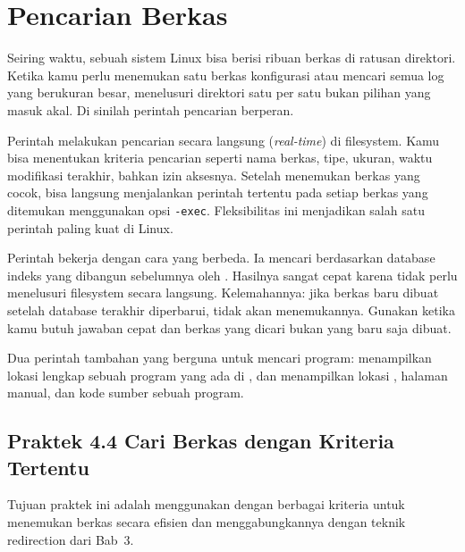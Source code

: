 \section{Pencarian Berkas}
\label{sec:search}

Seiring waktu, sebuah sistem Linux bisa berisi ribuan berkas di ratusan direktori. Ketika
kamu perlu menemukan satu berkas konfigurasi atau mencari semua log yang berukuran besar,
menelusuri direktori satu per satu bukan pilihan yang masuk akal. Di sinilah perintah
pencarian berperan.

Perintah  melakukan pencarian secara langsung (\textit{real-time}) di filesystem.
Kamu bisa menentukan kriteria pencarian seperti nama berkas, tipe, ukuran, waktu modifikasi
terakhir, bahkan izin aksesnya. Setelah menemukan berkas yang cocok,  bisa
langsung menjalankan perintah tertentu pada setiap berkas yang ditemukan menggunakan opsi
\texttt{-exec}. Fleksibilitas ini menjadikan  salah satu perintah paling kuat
di Linux.

Perintah  bekerja dengan cara yang berbeda. Ia mencari berdasarkan database
indeks yang dibangun sebelumnya oleh . Hasilnya sangat cepat karena tidak
perlu menelusuri filesystem secara langsung. Kelemahannya: jika berkas baru dibuat setelah
database terakhir diperbarui,  tidak akan menemukannya. Gunakan 
ketika kamu butuh jawaban cepat dan berkas yang dicari bukan yang baru saja dibuat.

Dua perintah tambahan yang berguna untuk mencari program:  menampilkan lokasi
lengkap sebuah program yang ada di , dan  menampilkan lokasi ,
halaman manual, dan kode sumber sebuah program.

\subsection*{Praktek 4.4 Cari Berkas dengan Kriteria Tertentu}

Tujuan praktek ini adalah menggunakan  dengan berbagai kriteria untuk menemukan
berkas secara efisien dan menggabungkannya dengan teknik redirection dari Bab~3.

